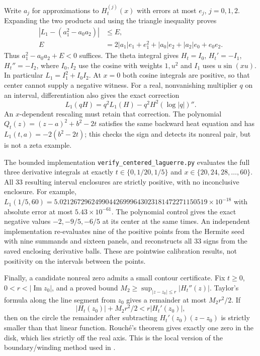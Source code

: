 Write $a_j$ for approximations to $H_t^{(j)}(x)$ with errors at
most $e_j$, $j=0,1,2$. Expanding the two products and using the
triangle inequality proves
\begin{align}
 |L_1-(a_1^2-a_0a_2)|&\le E,\\
 E&=2|a_1|e_1+e_1^2+|a_0|e_2+|a_2|e_0+e_0e_2.
 \label{eq:rh-laguerre-error}
\end{align}
Thus $a_1^2-a_0a_2+E<0$ suffices. The theta integral gives
$H_t=I_0$, $H_t'=-I_1$, $H_t''=-I_2$, where $I_0,I_2$ use the
cosine with weights $1,u^2$ and $I_1$ uses $u\sin(xu)$.
In particular $L_1=I_1^2+I_0I_2$. At $x=0$ both cosine integrals
are positive, so that center cannot supply a negative witness.
For a real, nonvanishing multiplier $q$ on an interval, differentiation
also gives the exact correction
\[
 L_1(qH)=q^2L_1(H)-q^2H^2(\log|q|)''.
\]
An $x$-dependent rescaling must retain that correction.
The polynomial $Q_t(z)=(z-a)^2+b^2-2t$ satisfies the same backward
heat equation and has $L_1(t,a)=-2(b^2-2t)$; this checks the sign
and detects its nonreal pair, but is not a zeta example.

The bounded implementation \texttt{verify\_centered\_laguerre.py}
evaluates the full three derivative integrals at exactly
$t\in\{0,1/20,1/5\}$ and $x\in\{20,24,28,\ldots,60\}$.
All 33 resulting interval enclosures are strictly positive, with
no inconclusive enclosure. For example,
$L_1(1/5,60)=5.021267296249904426999643023181472271150519
\times10^{-18}$ with absolute error at most $5.43\times10^{-61}$.
The polynomial control gives the exact negative values
$-2,-9/5,-6/5$ at its center at the same times. An independent
implementation re-evaluates nine of the positive points from the
Hermite seed with nine summands and sixteen panels, and reconstructs
all 33 signs from the saved enclosing derivative balls. These are
pointwise calibration results, not positivity on the intervals
between the points.

Finally, a candidate nonreal zero admits a small contour certificate.
Fix $t\ge0$, $0<r<|\operatorname{Im}z_0|$, and a proved bound
$M_2\ge\sup_{|z-z_0|\le r}|H_t''(z)|$. Taylor's formula along
the line segment from $z_0$ gives a remainder at most $M_2r^2/2$.
If
\begin{equation}
 |H_t(z_0)|+M_2r^2/2<r|H_t'(z_0)|,
 \label{eq:rh-local-rouche}
\end{equation}
then on the circle the remainder after subtracting
$H_t'(z_0)(z-z_0)$ is strictly smaller than that linear function.
Rouch\'e's theorem gives exactly one zero in the disk, which lies
strictly off the real axis. This is the local version of the
boundary/winding method used in \cite[\S8.3]{polymath2019}.

